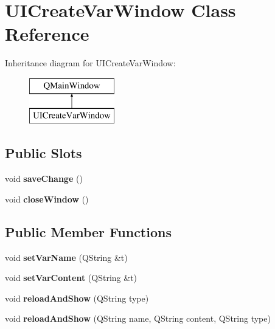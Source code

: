 \hypertarget{class_u_i_create_var_window}{}\section{U\+I\+Create\+Var\+Window Class Reference}
\label{class_u_i_create_var_window}
Inheritance diagram for U\+I\+Create\+Var\+Window\+:\begin{figure}[H]
\begin{center}
\leavevmode
\includegraphics[height=2.000000cm]{class_u_i_create_var_window}
\end{center}
\end{figure}
\subsection*{Public Slots}
\begin{DoxyCompactItemize}
\item 
void {\bfseries save\+Change} ()\hypertarget{class_u_i_create_var_window_af32556e9bd60360594f980f868fbcf71}{}\label{class_u_i_create_var_window_af32556e9bd60360594f980f868fbcf71}

\item 
void {\bfseries close\+Window} ()\hypertarget{class_u_i_create_var_window_acfc107eff898d9fa1d3b256591667d31}{}\label{class_u_i_create_var_window_acfc107eff898d9fa1d3b256591667d31}

\end{DoxyCompactItemize}
\subsection*{Public Member Functions}
\begin{DoxyCompactItemize}
\item 
void {\bfseries set\+Var\+Name} (Q\+String \&t)\hypertarget{class_u_i_create_var_window_a5f11db2930e89e733acace6a05b969d6}{}\label{class_u_i_create_var_window_a5f11db2930e89e733acace6a05b969d6}

\item 
void {\bfseries set\+Var\+Content} (Q\+String \&t)\hypertarget{class_u_i_create_var_window_ab6ee7f49fdad1be69d945dd8e3358294}{}\label{class_u_i_create_var_window_ab6ee7f49fdad1be69d945dd8e3358294}

\item 
void {\bfseries reload\+And\+Show} (Q\+String type)\hypertarget{class_u_i_create_var_window_af04acdd098c4ac941684a4318aefbb0e}{}\label{class_u_i_create_var_window_af04acdd098c4ac941684a4318aefbb0e}

\item 
void {\bfseries reload\+And\+Show} (Q\+String name, Q\+String content, Q\+String type)\hypertarget{class_u_i_create_var_window_a0909f33858c4377f2fdbc9b7cf46aed9}{}\label{class_u_i_create_var_window_a0909f33858c4377f2fdbc9b7cf46aed9}

\end{DoxyCompactItemize}
